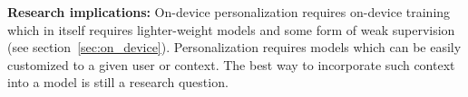 {\bf Research implications:} On-device personalization requires on-device
training which in itself requires lighter-weight models and some form of weak
supervision (see section~\ref{sec:on_device}).  Personalization requires models
which can be easily customized to a given user or context. The best way to
incorporate such context into a model is still a research question.
